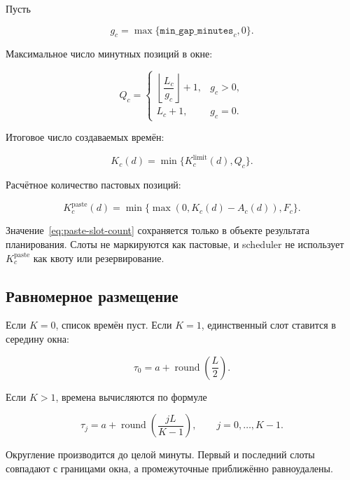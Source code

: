 \documentclass[12pt,a4paper]{article}
\newcommand{\Field}[1]{\texttt{#1}}
\begin{document}
Пусть

\begin{equation}
  g_c=\max\{\Field{min\_gap\_minutes}_c,0\}.
\end{equation}

Максимальное число минутных позиций в окне:

\begin{equation}
  Q_c=
  \begin{cases}
    \left\lfloor\dfrac{L_c}{g_c}\right\rfloor+1,&g_c>0,\\[6pt]
    L_c+1,&g_c=0.
  \end{cases}
  \label{eq:window-capacity}
\end{equation}

Итоговое число создаваемых времён:

\begin{equation}
  K_c(d)=\min\{K_c^{\mathrm{limit}}(d),Q_c\}.
  \label{eq:final-slot-count}
\end{equation}

Расчётное количество пастовых позиций:

\begin{equation}
  K_c^{\mathrm{paste}}(d)=
  \min\{\max(0,K_c(d)-A_c(d)),F_c\}.
  \label{eq:paste-slot-count}
\end{equation}

Значение~\eqref{eq:paste-slot-count} сохраняется только в объекте результата
планирования. Слоты не маркируются как пастовые, и scheduler не использует
$K_c^{\mathrm{paste}}$ как квоту или резервирование.

\subsection{Равномерное размещение}

Если $K=0$, список времён пуст. Если $K=1$, единственный слот ставится в
середину окна:

\begin{equation}
  \tau_0=a+\operatorname{round}\!\left(\frac{L}{2}\right).
\end{equation}

Если $K>1$, времена вычисляются по формуле

\begin{equation}
  \tau_j=
  a+\operatorname{round}\!\left(\frac{jL}{K-1}\right),
  \qquad j=0,\ldots,K-1.
  \label{eq:spread-times}
\end{equation}

Округление производится до целой минуты. Первый и последний слоты совпадают с
границами окна, а промежуточные приближённо равноудалены.
\end{document}
